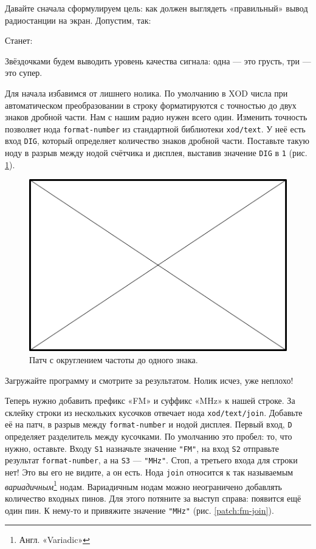 Давайте сначала сформулируем цель: как должен выглядеть «правильный» вывод радиостанции на экран. Допустим, так:

\begin{labeling}{Станет:}
  \item [Было:] 
  \item [Станет:] 
\end{labeling}

Звёздочками будем выводить уровень качества сигнала: одна — это грусть, три — это супер.

Для начала избавимся от лишнего нолика. По умолчанию в XOD числа при автоматическом преобразовании в строку форматируются с точностью до двух знаков дробной части. Нам с нашим радио нужен всего один. Изменить точность позволяет нода \texttt{format-number} из стандартной библиотеки \texttt{xod/text}. У неё есть вход \texttt{DIG}, который определяет количество знаков дробной части. Поставьте такую ноду в разрыв между нодой счётчика и дисплея, выставив значение \texttt{DIG} в \texttt{1} (рис. \ref{patch:fm-format-number}).

\begin{figure}
  \centering
  \includegraphics{TODO}
  \caption{Патч с округлением частоты до одного знака.}
  \label{patch:fm-format-number}
\end{figure}

Загружайте программу и смотрите за результатом. Нолик исчез, уже неплохо!

Теперь нужно добавить префикс «FM» и суффикс «MHz» к нашей строке. За склейку строки из нескольких кусочков отвечает нода \texttt{xod/text/join}. Добавьте её на патч, в разрыв между \texttt{format-number} и нодой дисплея. Первый вход, \texttt{D} определяет разделитель между кусочками. По умолчанию это пробел: то, что нужно, оставьте. Входу \texttt{S1} назначьте значение \texttt{"FM"}, на вход \texttt{S2} отправьте результат \texttt{format-number}, а на \texttt{S3} — \texttt{"MHz"}. Стоп, а третьего входа для строки нет! Это вы его не видите, а он есть. Нода \texttt{join} относится к так называемым \emph{вариадичным}\footnote{Англ. «Variadic»} нодам. Вариадичным нодам можно неограничено добавлять количество входных пинов. Для этого потяните за выступ справа: появится ещё один пин. К нему-то и привяжите значение \texttt{"MHz"} (рис. \ref{patch:fm-join}).

